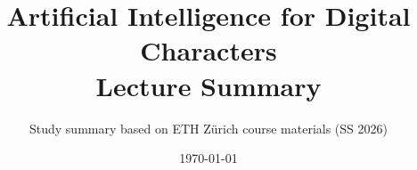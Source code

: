 \usepackage[margin=2.5cm]{geometry}
\usepackage[T1]{fontenc}
\usepackage[utf8]{inputenc}
\usepackage{lmodern}
\usepackage{microtype}
\usepackage{amsmath,amssymb}
\usepackage{graphicx}
\usepackage{hyperref}
\usepackage{enumitem}
\usepackage{booktabs}
\usepackage{xcolor}

\hypersetup{
  colorlinks=true,
  linkcolor=blue!60!black,
  urlcolor=blue!60!black,
  citecolor=blue!60!black
}


\newcommand{\goal}[1]{\textbf{Goal:} #1}
\newcommand{\problem}[1]{\textbf{Problem:} #1}
\newcommand{\term}[1]{\textit{#1}}

\title{Artificial Intelligence for Digital Characters\\Lecture Summary}
\author{Study summary based on ETH Z\"urich course materials (SS 2026)}
\date{\today}
